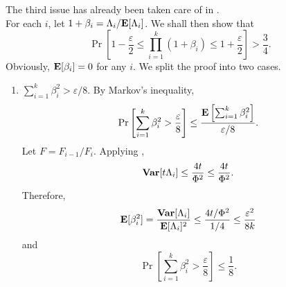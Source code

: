 The third issue has already been taken care of in .\\


For each $i$, let $1+\beta_i = \Lambda_i / \textbf{E}[\Lambda_i]$. We shall then show that
\begin{equation}
	\Pr\left[1-\frac{\varepsilon}{2} \leq \prod_{i=1}^k (1+\beta_i) \leq 1+\frac{\varepsilon}{2}\right] > \frac{3}{4}.
\end{equation}
Obviously, $\textbf{E}[\beta_i]=0$ for any $i$. We split the proof into two cases.\\
\begin{enumerate}
	\item $\sum_{i=1}^k \beta_i^2 > \varepsilon/8$. By Markov's inequality,
	\[ \Pr\left[\sum_{i=1}^k \beta_i^2 > \frac{\varepsilon}{8}\right] \leq \frac{\textbf{E}\left[\sum_{i=1}^k \beta_i^2\right]}{\varepsilon/8}. \]
	Let $F=F_{i-1}/F_i$. Applying ,
	\[ \operatorname{\textbf{Var}}[t\Lambda_i] \leq \frac{4t}{\Phi^2} \leq \frac{4t}{\Phi^2}. \]
	Therefore,
	\[ \textbf{E}[\beta_i^2] = \frac{\operatorname{\textbf{Var}}[\Lambda_i]}{\textbf{E}[\Lambda_i]^2} \leq \frac{4t/\Phi^2}{1/4} \leq \frac{\varepsilon^2}{8k} \]
	and
	\[ \Pr\left[\sum_{i=1}^k \beta_i^2 > \frac{\varepsilon}{8}\right] \leq \frac{1}{8}. \]


\end{enumerate}
